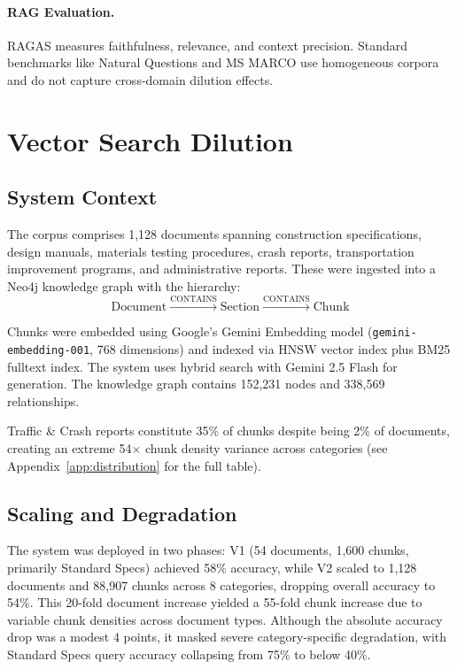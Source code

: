\documentclass{article}
\newcommand{\numDocs}{1{,}128}
\newcommand{\numChunks}{88{,}907}
\begin{document}
\paragraph{RAG Evaluation.}
RAGAS \cite{es2024ragas} measures faithfulness, relevance, and context precision. Standard benchmarks like Natural Questions \cite{kwiatkowski2019natural} and MS MARCO \cite{nguyen2016msmarco} use homogeneous corpora and do not capture cross-domain dilution effects.

\section{Vector Search Dilution}
\label{sec:dilution}

\subsection{System Context}

The corpus comprises \numDocs{} documents spanning construction specifications, design manuals, materials testing procedures, crash reports, transportation improvement programs, and administrative reports. These were ingested into a Neo4j knowledge graph with the hierarchy:
\begin{equation}
\text{Document} \xrightarrow{\text{CONTAINS}} \text{Section} \xrightarrow{\text{CONTAINS}} \text{Chunk}
\end{equation}

Chunks were embedded using Google's Gemini Embedding model (\texttt{gemini-embedding-001}, 768 dimensions) and indexed via HNSW vector index plus BM25 fulltext index. The system uses hybrid search \cite{sawarkar2024blended} with Gemini 2.5 Flash for generation. The knowledge graph contains 152,231 nodes and 338,569 relationships.

Traffic \& Crash reports constitute 35\% of chunks despite being 2\% of documents, creating an extreme 54$\times$ chunk density variance across categories (see Appendix~\ref{app:distribution} for the full table).


\subsection{Scaling and Degradation}

The system was deployed in two phases: V1 (54 documents, 1,600 chunks, primarily Standard Specs) achieved 58\% accuracy, while V2 scaled to \numDocs{} documents and \numChunks{} chunks across 8 categories, dropping overall accuracy to 54\%. This 20-fold document increase yielded a 55-fold chunk increase due to variable chunk densities across document types. Although the absolute accuracy drop was a modest 4 points, it masked severe category-specific degradation, with Standard Specs query accuracy collapsing from 75\% to below 40\%.
\end{document}
